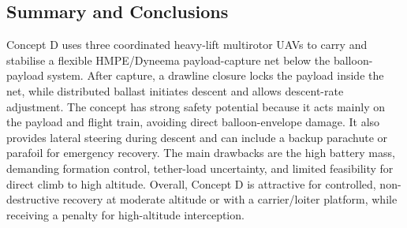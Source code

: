 \subsection{Summary and Conclusions}
Concept D uses three coordinated heavy-lift multirotor UAVs to carry and stabilise a flexible HMPE/Dyneema payload-capture net below the balloon-payload system. After capture, a drawline closure locks the payload inside the net, while distributed ballast initiates descent and allows descent-rate adjustment. The concept has strong safety potential because it acts mainly on the payload and flight train, avoiding direct balloon-envelope damage. It also provides lateral steering during descent and can include a backup parachute or parafoil for emergency recovery. The main drawbacks are the high battery mass, demanding formation control, tether-load uncertainty, and limited feasibility for direct climb to high altitude. Overall, Concept D is attractive for controlled, non-destructive recovery at moderate altitude or with a carrier/loiter platform, while receiving a penalty for high-altitude  interception. 

